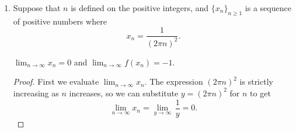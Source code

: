 \begin{enumerate}
\begin{enumerate}
                \begin{proof}
                    Suppose that $\lim_{x \rightarrow 0^+} f(x)$ exists and is equal to $L$.

                    Note that $\lim_{x \rightarrow 0^+} g(x) = -1$ since
                    \[ g(0) = \frac{0^2 - 1}{0^2 + 1} = -1. \]

                    From \cref{thm:limit-product},
                    \[ L = \left[\lim_{x \rightarrow 0^+} g(x)\right] \left[\lim_{x \rightarrow 0^+} h(x)\right] = - \left[\lim_{x \rightarrow 0^+} h(x)\right]. \]

                    As $x \rightarrow 0^+$, $\frac{1}{\sqrt{x}} \rightarrow \infty$; the limit is defined because $x$ is always positive.
                    This means that with $y = \frac{1}{\sqrt{x}}$, the expression $\lim_{x \rightarrow 0^+} h(x)$ is equivalent to $\lim_{y \rightarrow \infty} \cos y$, which is undefined as $\cos y$ is periodic.

                    \smallskip

                    It follows that $L$ is also undefined, contradicting the supposition that $\lim_{x \rightarrow 0^+} f(x)$ exists. Thus, $\lim_{x \rightarrow 0^+} f(x)$ does not exist.
                \end{proof}

                \bigskip

            \item Suppose that $n$ is defined on the positive integers, and $\{x_n\}_{n \ge 1}$ is a sequence of positive numbers where
                \[ x_n = \frac{1}{(2 \pi n)^2}. \]

                \begin{proposition} \label{prop:8}
                    $\lim_{n \rightarrow \infty} x_n = 0$ and $\lim_{n \rightarrow \infty} f(x_n) = -1$.
                \end{proposition}

                \begin{proof}
                    First we evaluate $\lim_{n \rightarrow \infty} x_n$.
                    The expression $(2 \pi n)^2$ is strictly increasing as $n$ increases, so we can substitute $y = (2 \pi n)^2$ for $n$ to get
                    \begin{equation} \label{eq:3}
                        \lim_{n \rightarrow \infty} x_n = \lim_{y \rightarrow \infty} \, \frac{1}{y} = 0.
                    \end{equation}


\end{proof}
\end{enumerate}
\end{enumerate}

